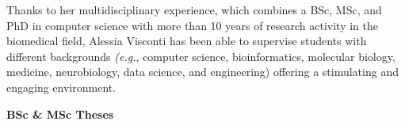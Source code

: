 


\noindent
Thanks to her multidisciplinary experience, which combines a BSc, MSc, and PhD in computer science with more than 10 years of research activity in the biomedical field, Alessia Visconti has been able to supervise students with different backgrounds \emph{(e.g.}, computer science, bioinformatics, molecular biology, medicine, neurobiology, data science, and engineering) offering a stimulating and engaging environment.

\vspace{0.4cm}

\noindent \textbf{BSc \& MSc Theses}


